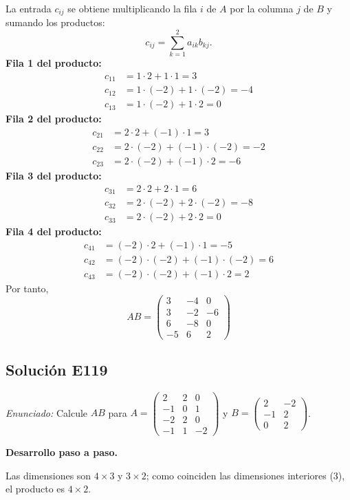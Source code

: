 \documentclass[12pt]{article}
\theoremstyle{remark}
\newcommand{\solucion}[2]{\Needspace{11\baselineskip}\subsection*{Solución E#1}\noindent\textit{Enunciado:} #2\par\medskip\noindent\textbf{Desarrollo paso a paso.}\par\medskip}
\begin{document}
La entrada $c_{ij}$ se obtiene multiplicando la fila $i$ de $A$ por la columna $j$ de $B$ y sumando los productos:
\[
c_{ij}=\sum_{k=1}^{2} a_{ik}b_{kj}.
\]
\textbf{Fila 1 del producto:}
\[
\begin{aligned}c_{11}&=1\cdot 2+1\cdot 1=3\\c_{12}&=1\cdot (-2)+1\cdot (-2)=-4\\c_{13}&=1\cdot (-2)+1\cdot 2=0\end{aligned}
\]
\textbf{Fila 2 del producto:}
\[
\begin{aligned}c_{21}&=2\cdot 2+(-1)\cdot 1=3\\c_{22}&=2\cdot (-2)+(-1)\cdot (-2)=-2\\c_{23}&=2\cdot (-2)+(-1)\cdot 2=-6\end{aligned}
\]
\textbf{Fila 3 del producto:}
\[
\begin{aligned}c_{31}&=2\cdot 2+2\cdot 1=6\\c_{32}&=2\cdot (-2)+2\cdot (-2)=-8\\c_{33}&=2\cdot (-2)+2\cdot 2=0\end{aligned}
\]
\textbf{Fila 4 del producto:}
\[
\begin{aligned}c_{41}&=(-2)\cdot 2+(-1)\cdot 1=-5\\c_{42}&=(-2)\cdot (-2)+(-1)\cdot (-2)=6\\c_{43}&=(-2)\cdot (-2)+(-1)\cdot 2=2\end{aligned}
\]
Por tanto,
\[
\boxed{AB=\begin{pmatrix}3&-4&0\\3&-2&-6\\6&-8&0\\-5&6&2\end{pmatrix}}
\]

\medskip

\solucion{119}{Calcule $AB$ para $A=\begin{pmatrix}2&2&0\\-1&0&1\\-2&2&0\\-1&1&-2\end{pmatrix}$ y $B=\begin{pmatrix}2&-2\\-1&2\\0&2\end{pmatrix}$.}
Las dimensiones son $4\times3$ y $3\times2$; como coinciden las dimensiones interiores (3), el producto es $4\times2$.
\end{document}
